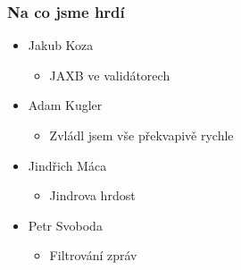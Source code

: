 \documentclass{beamer}
\begin{document}
\begin{frame}[allowframebreaks]\frametitle{Na co jsme hrdí} 
  \begin{itemize}
    \item Jakub Koza
      \begin{itemize}
       \item JAXB ve validátorech
     \end{itemize}
   
    \item Adam Kugler
      \begin{itemize}
       \item Zvládl jsem vše překvapivě rychle
     \end{itemize}

    \item Jindřich Máca
      \begin{itemize}
       \item Jindrova hrdost
      \end{itemize}  
   
    \item Petr Svoboda
      \begin{itemize}
       \item Filtrování zpráv
     \end{itemize}
   \end{itemize}  
\end{frame}
\end{document}
